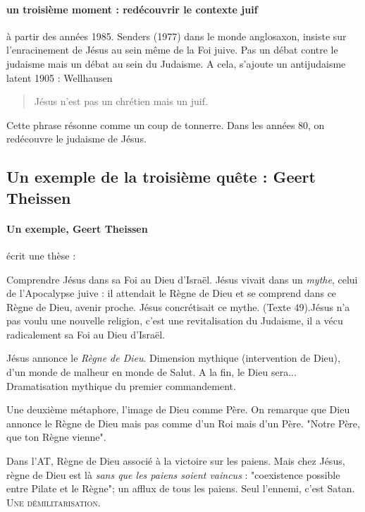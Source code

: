 \paragraph{un troisième moment : redécouvrir le contexte juif} à partir des années 1985. Senders (1977) dans le monde anglosaxon, insiste sur l'enracinement de Jésus au sein même de la Foi juive. Pas un débat contre le judaisme mais un débat au sein du Judaisme.  A cela, s'ajoute un antijudaisme latent 
1905 : Wellhausen 
\begin{quote}
    Jésus n'est pas un chrétien mais un juif.
\end{quote}
Cette phrase résonne comme un coup de tonnerre. 
Dans les années 80, on redécouvre le judaisme de Jésus. 

\subsection{Un exemple de la troisième quête : Geert Theissen }
\paragraph{Un exemple, Geert Theissen} écrit une thèse : 
\bi
\item Comprendre Jésus dans sa Foi au Dieu d'Israël. Jésus vivait dans un \textit{mythe}, celui de l'Apocalypse juive : il attendait le Règne de Dieu et se comprend dans ce Règne de Dieu, avenir proche.  Jésus concrétisait ce mythe. (Texte 49).Jésus n'a pas voulu une nouvelle religion, c'est une revitalisation du Judaisme, il a vécu radicalement sa Foi au Dieu d'Israël. 
\item Jésus annonce le \textit{Règne de Dieu}. Dimension mythique (intervention de Dieu), d'un monde de malheur en monde de Salut. A la fin, le Dieu sera... Dramatisation mythique du premier commandement. 
\item Une deuxième métaphore, l'image de Dieu comme Père. On remarque que Dieu annonce le Règne de Dieu mais pas comme d'un Roi mais d'un Père. "Notre Père, que ton Règne vienne". 
\item Dans l'AT, Règne de Dieu associé à la victoire sur les paiens. Mais chez Jésus, règne de Dieu est là \textit{sans que les paiens soient vaincus} : "coexistence possible entre Pilate et le Règne"; un afflux de tous les paiens. Seul l'ennemi, c'est Satan. \textsc{Une démilitarisation}.


\ei

